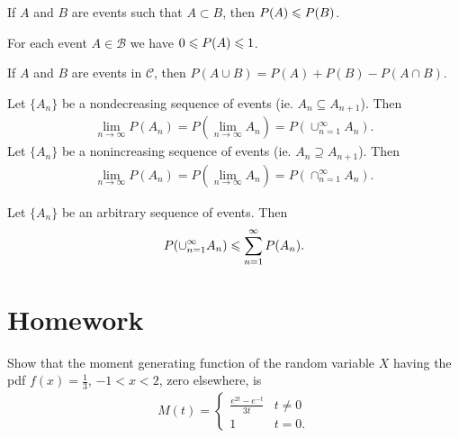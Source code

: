 \begin{theorem}{}{}
    If $A$ and $B$ are events such that $A\subset B$,
    then $P(A)\leqslant P(B)$.
\end{theorem}

\begin{theorem}{}{}
    For each event $A\in\mathcal{B}$ we have $0\leqslant P(A)\leqslant 1$.
\end{theorem}

\begin{theorem}{}{}
    If $A$ and $B$ are events in $\mathcal{C}$,
    then $P(A\cup B)=P(A)+P(B)-P(A\cap B)$.
\end{theorem}

\begin{theorem}{}{}
    Let $\{A_n\}$ be a nondecreasing sequence of events (ie. $A_n\subseteq A_{n+1}$). Then
    \begin{align*}
        \lim_{n\rightarrow \infty} P(A_n)=P(\lim_{n\rightarrow \infty}A_n)=P(\cup_{n=1}^{\infty}A_n).
    \end{align*}
    Let $\{A_n\}$ be a nonincreasing sequence of events (ie. $A_n\supseteq A_{n+1}$). Then
    \begin{align*}
        \lim_{n\rightarrow \infty} P(A_n)=P(\lim_{n\rightarrow \infty}A_n)=P(\cap_{n=1}^{\infty}A_n).
    \end{align*}
\end{theorem}

\begin{theorem}{}{}
    Let $\{A_n\}$ be an arbitrary sequence of events. Then
    \begin{align*}
        P(\cup_{n=1}^{\infty}A_n)\leqslant \sum\limits_{n=1}^{\infty}P(A_n).
    \end{align*}
\end{theorem}



\section{Homework}

\begin{exercise}{}{}
    Show that the moment generating function of the random variable $X$
    having the pdf $f(x)=\frac{1}{3}$, $-1<x<2$, zero elsewhere, is
    \begin{align*}
        M(t) = \left\{\begin{matrix}
            \frac{e^{2t}-e^{-t}}{3t} & t\neq 0\\
            1 & t=0.
           \end{matrix}\right.
    \end{align*}
\end{exercise}

